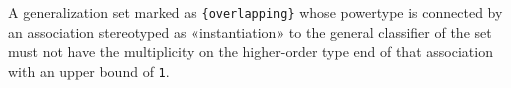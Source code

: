 \begin{constraint}
\label{constraint:overlappingGeneralizationSetForbidsSingleInstantiation}
A generalization set marked as \texttt{\{overlapping\}} whose powertype is connected by an association stereotyped as «instantiation» to the general classifier of the set must not have the multiplicity on the higher-order type end of that association with an upper bound of \texttt{1}. %

\end{constraint}
